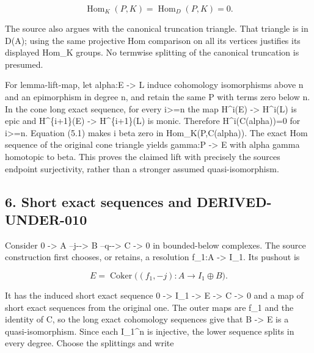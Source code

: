 \documentclass[11pt]{article}
\begin{document}
\[
 \operatorname{Hom}_K(P,K)=\operatorname{Hom}_D(P,K)=0.    \tag{5.1}
\]

The source also argues with the canonical truncation triangle. That triangle is in D(A)\allowbreak{}; using the same projective Hom comparison on all its vertices justifies its displayed Hom\_\allowbreak{}K groups. No termwise splitting of the canonical truncation is presumed.

For lemma-lift-map,\allowbreak{} let alpha:\allowbreak{}E \allowbreak{}-> L induce cohomology isomorphisms above n and an epimorphism in degree n,\allowbreak{} and retain the same P with terms zero below n. In the cone long exact sequence,\allowbreak{} for every i>\allowbreak{}=n the map H\textasciicircum{}i(E)\allowbreak{} \allowbreak{}-> H\textasciicircum{}i(L)\allowbreak{} is epic and H\textasciicircum{}\{i\allowbreak{}+1\}(E)\allowbreak{} \allowbreak{}-> H\textasciicircum{}\{i\allowbreak{}+1\}(L)\allowbreak{} is monic. Therefore H\textasciicircum{}i(C(alpha)\allowbreak{})\allowbreak{}\allowbreak{}=0 for i>\allowbreak{}=n. Equation (5.1)\allowbreak{} makes i beta zero in Hom\_\allowbreak{}K(P,\allowbreak{}C(alpha)\allowbreak{})\allowbreak{}. The exact Hom sequence of the original cone triangle yields gamma:\allowbreak{}P \allowbreak{}-> E with alpha gamma homotopic to beta. This proves the claimed lift with precisely the source\textquotesingle s endpoint surjectivity,\allowbreak{} rather than a stronger assumed quasi-isomorphism.

\subsection{6. Short exact sequences and DERIVED-UNDER-010}\label{proofs-6209-7089-short-exact-sequences-and-derived-under-010}

Consider 0 \allowbreak{}-> A --j-\allowbreak{}-> B --q-\allowbreak{}-> C \allowbreak{}-> 0 in bounded-below complexes. The source construction first chooses,\allowbreak{} or retains,\allowbreak{} a resolution f\_\allowbreak{}1:\allowbreak{}A \allowbreak{}-> I\_\allowbreak{}1. Its pushout is

\[
 E=\operatorname{Coker}\big((f_1,-j):A\longrightarrow I_1\oplus B\big).
                                                               \tag{6.1}
\]

It has the induced short exact sequence 0 \allowbreak{}-> I\_\allowbreak{}1 \allowbreak{}-> E \allowbreak{}-> C \allowbreak{}-> 0 and a map of short exact sequences from the original one. The outer maps are f\_\allowbreak{}1 and the identity of C,\allowbreak{} so the long exact cohomology sequences give that B \allowbreak{}-> E is a quasi-isomorphism. Since each I\_\allowbreak{}1\textasciicircum{}n is injective,\allowbreak{} the lower sequence splits in every degree. Choose the splittings and write
\end{document}
